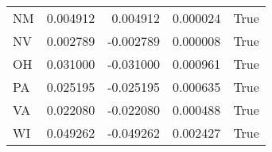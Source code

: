 \begin{table}
\begin{tabular}{lrrrl}
      NM &   0.004912 &  0.004912 &       0.000024 &          True \\
      NV &   0.002789 & -0.002789 &       0.000008 &          True \\
      OH &   0.031000 & -0.031000 &       0.000961 &          True \\
      PA &   0.025195 & -0.025195 &       0.000635 &          True \\
      VA &   0.022080 & -0.022080 &       0.000488 &          True \\
      WI &   0.049262 & -0.049262 &       0.002427 &          True \\
\bottomrule
\end{tabular}
\end{table}
